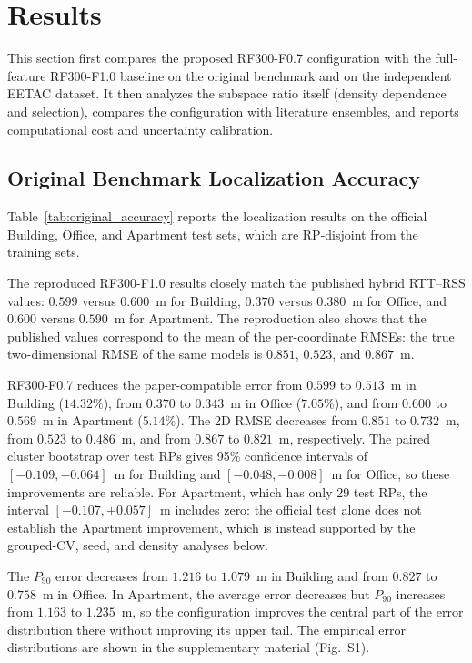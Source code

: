 \section{Results}
\label{sec:results}

This section first compares the proposed RF300-F0.7 configuration with the full-feature RF300-F1.0 baseline on the original benchmark and on the independent EETAC dataset. It then analyzes the subspace ratio itself (density dependence and selection), compares the configuration with literature ensembles, and reports computational cost and uncertainty calibration.

\subsection{Original Benchmark Localization Accuracy}
\label{subsec:original_results}

Table~\ref{tab:original_accuracy} reports the localization results on the official Building, Office, and Apartment test sets, which are RP-disjoint from the training sets.



The reproduced RF300-F1.0 results closely match the published hybrid RTT--RSS values: $0.599$ versus $0.600$~m for Building, $0.370$ versus $0.380$~m for Office, and $0.600$ versus $0.590$~m for Apartment. The reproduction also shows that the published values correspond to the mean of the per-coordinate RMSEs: the true two-dimensional RMSE of the same models is $0.851$, $0.523$, and $0.867$~m.

RF300-F0.7 reduces the paper-compatible error from $0.599$ to $0.513$~m in Building ($14.32\%$), from $0.370$ to $0.343$~m in Office ($7.05\%$), and from $0.600$ to $0.569$~m in Apartment ($5.14\%$). The 2D RMSE decreases from $0.851$ to $0.732$~m, from $0.523$ to $0.486$~m, and from $0.867$ to $0.821$~m, respectively. The paired cluster bootstrap over test RPs gives 95\% confidence intervals of $[-0.109,-0.064]$~m for Building and $[-0.048,-0.008]$~m for Office, so these improvements are reliable. For Apartment, which has only 29 test RPs, the interval $[-0.107,+0.057]$~m includes zero: the official test alone does not establish the Apartment improvement, which is instead supported by the grouped-CV, seed, and density analyses below.

The $P_{90}$ error decreases from $1.216$ to $1.079$~m in Building and from $0.827$ to $0.758$~m in Office. In Apartment, the average error decreases but $P_{90}$ increases from $1.163$ to $1.235$~m, so the configuration improves the central part of the error distribution there without improving its upper tail. The empirical error distributions are shown in the supplementary material (Fig.~S1).


